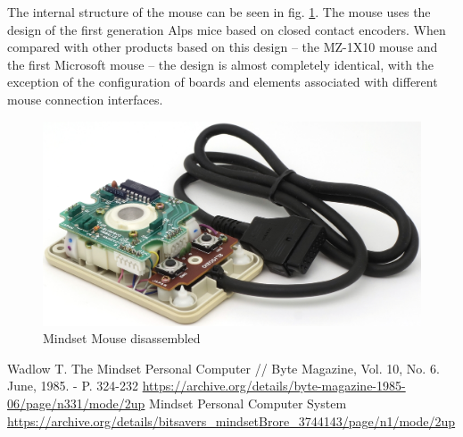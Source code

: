 \documentclass[11pt, a4paper]{article}
\begin{document}
The internal structure of the mouse can be seen in fig. \ref{fig:MindsetMouseInside}. The mouse uses the design of the first generation Alps mice based on closed contact encoders. When compared with other products based on this design -- the MZ-1X10 mouse and the first Microsoft mouse -- the design is almost completely identical, with the exception of the configuration of boards and elements associated with different mouse connection interfaces.

 \begin{figure}[h]
    \centering
    \includegraphics[scale=1]{1984_mindset_mouse/inside_30.jpg}
    \caption{Mindset Mouse disassembled}
    \label{fig:MindsetMouseInside}
\end{figure}

\begin{thebibliography}{9}
 Wadlow T. The Mindset Personal Computer // Byte Magazine, Vol. 10, No. 6. June, 1985. - P. 324-232 \url{https://archive.org/details/byte-magazine-1985-06/page/n331/mode/2up}
 Mindset Personal Computer System \url{https://archive.org/details/bitsavers_mindsetBrore_3744143/page/n1/mode/2up}
\end{thebibliography}
\end{document}
